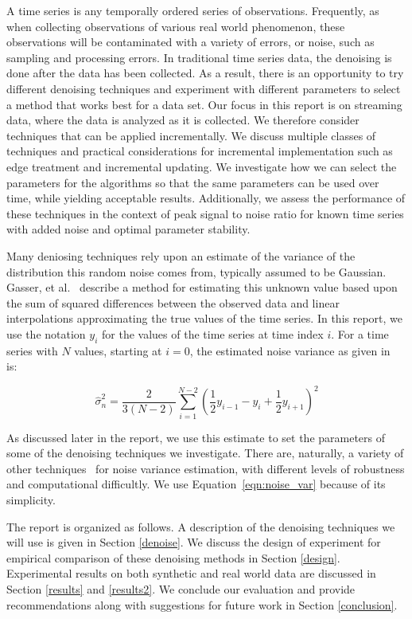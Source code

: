 \documentclass[11pt]{article}
\theoremstyle{definition}
\begin{document}
A time series is any temporally ordered series of observations.
Frequently, as when collecting observations of various real world
phenomenon, these observations will be contaminated with a variety of
errors, or noise, such as sampling and processing errors. In
traditional time series data, the denoising is done after the data has
been collected. As a result, there is an opportunity to try different
denoising techniques and experiment with different parameters to
select a method that works best for a data set. Our focus in this report is
on streaming data, where the data is analyzed as it is collected. We therefore consider techniques that can be applied
incrementally.  We discuss multiple classes of techniques and
practical considerations for incremental implementation such as edge
treatment and incremental updating. We investigate how we can select
the parameters for the algorithms so that the same parameters can be
used over time, while yielding acceptable results.  Additionally, we
assess the performance of these techniques in the context of peak
signal to noise ratio for known time series with added noise and
optimal parameter stability.


Many deniosing techniques rely upon an estimate of the variance of the
distribution this random noise comes from, typically assumed to be
Gaussian. Gasser, et al.~\cite{Gasser86} describe a method for
estimating this unknown value based upon the sum of squared
differences between the observed data and linear interpolations
approximating the true values of the time series. In this report, we
use the notation $y_i$ for the values of the time series at time index
$i$. For a time series with $N$ values, starting at $i = 0$, the
estimated noise variance as given in ~\cite{Gasser86} is:


\begin{displaymath}
  \hat{\sigma} ^2_n = \frac{2}{3 \left( N - 2 \right)} \sum _{i = 1} ^{N - 2} \left( \frac{1}{2} y_{i - 1} - y_i + \frac{1}{2} y_{i + 1} \right) ^2
\label{eqn:noise_var}
\end{displaymath}

As discussed later in the report, we use this estimate to set the
parameters of some of the denoising techniques we investigate.  There
are, naturally, a variety of other techniques~\cite{Donoho94,immerkaer96:noise} for
noise variance estimation, with different levels of robustness and
computational difficultly. We use Equation~\ref{eqn:noise_var} because
of its simplicity.

The report is organized as follows. A description of the denoising
techniques we will use is given in Section \ref{denoise}. We discuss
the design of experiment for empirical comparison of these denoising
methods in Section \ref{design}. Experimental results on both
synthetic and real world data are discussed in Section \ref{results} and \ref{results2}.
We conclude our evaluation and provide recommendations along with
suggestions for future work in Section \ref{conclusion}.
\end{document}
